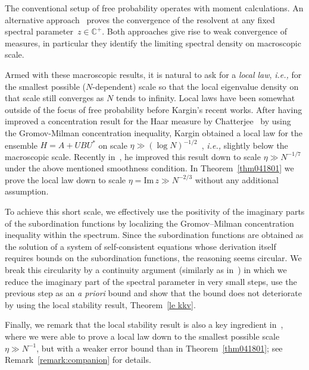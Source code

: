 \documentclass[10pt,reqno]{amsart}
\numberwithin{equation}{section}
\theoremstyle{plain}
\numberwithin{kevin}{section}
\theoremstyle{remark}
\newcommand{\im}{\mathrm{Im}\,}
\newcommand{\C}{{\mathbb C}}
\newcommand{\ie}{\emph{i.e., }}
\begin{document}
The conventional setup of free probability operates with moment calculations. An alternative approach~\cite{VP} proves the convergence of the resolvent at
any fixed spectral parameter~$z\in \C^+$. Both approaches give rise to weak convergence of measures, in particular they identify the limiting spectral density on macroscopic scale.


Armed with these macroscopic results,
 it is natural to ask for a {\it local law}, \ie for the smallest possible ($N$-dependent) scale so that the 
local eigenvalue density on that scale still converges as  $N$ tends to infinity. Local laws have been somewhat outside of the focus of free probability before Kargin's recent works.
 After having improved a concentration 
result for the Haar measure by Chatterjee~\cite{Chatterjee} by using the Gromov-Milman concentration inequality, Kargin obtained a
local law for the ensemble $H=A+UBU^*$  on scale  $\eta \gg (\log N)^{-1/2}$~\cite{Kargin2012}, \ie slightly below the macroscopic scale. Recently in~\cite{Kargin}, he improved this result down to scale $\eta\gg N^{-1/7}$
 under the above mentioned smoothness condition.
In Theorem~\ref{thm041801} we prove the local law 
down to scale $\eta = \im z\gg N^{-2/3}$ without any
additional assumption. 

To achieve this short scale, we effectively use the positivity of the imaginary
parts of the subordination functions by localizing the Gromov--Milman concentration
inequality within the spectrum.
 Since the subordination functions are obtained as 
the solution of a system of self-consistent equations whose derivation itself requires
bounds on the subordination functions, the reasoning seems circular. We break this
circularity by a continuity argument (similarly as in~\cite{ESY}) in which we reduce the imaginary part of
the spectral parameter in very small steps, use the previous step as an {\it a priori} bound
and show that the bound does not deteriorate by using the local  stability result, Theorem~\ref{le kkv}.

Finally, we remark that the local stability result is also a key ingredient in~\cite{BES15-2},
where we were able to prove a local law down to the smallest possible scale $\eta\gg N^{-1}$, but
with a weaker error bound than in Theorem~\ref{thm041801}; see Remark~\ref{remark:companion} for details.
\end{document}
